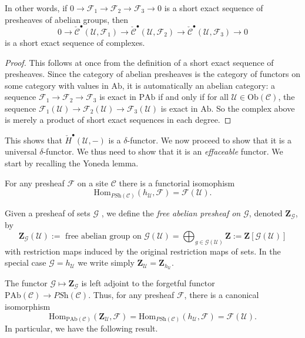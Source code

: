 In other words, if $0\to \mathcal{F}_1\to \mathcal{F}_2\to \mathcal{F}_3\to 0$ is a short exact sequence of presheaves of abelian groups, then  
$$
0 \to \check{\mathcal{C}}^\bullet\left(\mathcal{U}, \mathcal{F}_1\right) \to\check{\mathcal{C}}^\bullet(\mathcal{U}, \mathcal{F}_2) \to \check{\mathcal{C}}^\bullet(\mathcal{U}, \mathcal{F}_3)\to 0 
$$
is a short exact sequence of complexes.
  
\begin{proof}
This follows at once from the definition of a short exact sequence of presheaves. Since the category of abelian presheaves is the category of functors on some category with values in $\text{Ab}$, it is automatically an abelian category: a sequence $\mathcal{F}_1\to \mathcal{F}_2\to \mathcal{F}_3$ is exact in $\text{PAb}$ if and only if for all $\mathcal{U}\in \text{Ob}(\mathcal{C})$, the sequence $\mathcal{F}_1(\mathcal{U})\to \mathcal{F}_2(\mathcal{U})\to \mathcal{F}_3(\mathcal{U})$ is exact in $\text{Ab}$. So the complex above is merely a product of short exact sequences in each degree.
  \end{proof}
  
This shows that $\check{H}^\bullet(\mathcal{U}, -)$ is a $\delta$-functor. 
We now proceed to show that it is a universal $\delta$-functor. We thus need to show that it is an \emph{effaceable} functor. We start by recalling the Yoneda lemma.
  
  \begin{lemma}
    For any presheaf $\mathcal{F}$ on a site $\mathcal{C}$ there is a functorial isomophism
      $$
        \text{Hom}_{\textit{PSh}(\mathcal{C})} (h_{\mathcal{U}}, \mathcal{F}) = \mathcal{F}(\mathcal{U}).
$$
  \end{lemma}
  
  \begin{definition}
  Given a presheaf of sets $\mathcal{G}$ , we define the \emph{free abelian presheaf on $\mathcal{G}$}, denoted $\mathbf{Z}_{\mathcal{G}}$, by
$$
    \mathbf{Z}_{\mathcal{G}}(\mathcal{U}) := \text{ free abelian group on }\mathcal{G}(\mathcal{U}) = \bigoplus_{g\in \mathcal{G}(\mathcal{U})}\mathbf{Z}  := \mathbf{Z}\left[\mathcal{G}(\mathcal{U})\right]
  $$
  with restriction maps induced by the original restriction maps of sets. In the special case $\mathcal{G} = h_\mathcal{U}$ we write simply $\mathbf{Z}_\mathcal{U} = \mathbf{Z}_{h_\mathcal{U}}$.
  \end{definition}
  
  The functor $\mathcal{G} \mapsto \mathbf{Z}_\mathcal{G}$ is left adjoint to the forgetful
  functor $\text{PAb}(\mathcal{C}) \to \textit{PSh}(\mathcal{C})$.  Thus, for any presheaf $\mathcal{F}$, there is a canonical isomorphism
 $$
    \text{Hom}_{\text{PAb}(\mathcal{C})}\left(\mathbf{Z}_\mathcal{U}, \mathcal{F}\right)=
    \text{Hom}_{\textit{PSh}(\mathcal{C})}(h_\mathcal{U}, \mathcal{F}) = \mathcal{F}(\mathcal{U}).
$$
  In particular, we have the following result.
  
